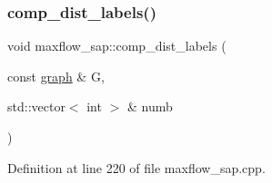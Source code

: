 \subsubsection{\texorpdfstring{comp\+\_\+dist\+\_\+labels()}{comp\_dist\_labels()}}
{\footnotesize\ttfamily void maxflow\+\_\+sap\+::comp\+\_\+dist\+\_\+labels (\begin{DoxyParamCaption}\item[{const \mbox{\hyperlink{classgraph}{graph}} \&}]{G,  }\item[{std\+::vector$<$ int $>$ \&}]{numb }\end{DoxyParamCaption})\hspace{0.3cm}{\ttfamily [protected]}}



Definition at line 220 of file maxflow\+\_\+sap.\+cpp.


